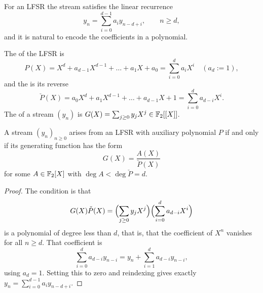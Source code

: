 \documentclass[a4paper]{scrartcl}
\begin{document}
\begin{center}
\end{center}

For an LFSR the stream satisfies the linear recurrence
$$y_n = \sum_{i=0}^{d-1}a_iy_{n-d+i}, \qquad n \ge d,$$
and it is natural to encode the coefficients in a polynomial.

\begin{definition}
	The  of the LFSR is
	$$P(X) = X^d + a_{d-1}X^{d-1}+\dots+a_1X+a_0 = \sum_{i=0}^d a_iX^i \quad (a_d := 1),$$
	and the  is its reverse
	$$\check P(X) = a_0X^d+a_1X^{d-1}+\dots+a_{d-1}X+1 = \sum_{i=0}^d a_{d-i}X^i.$$
	The  of a stream $(y_n)$ is $G(X) = \sum_{j\ge0}y_jX^j \in \mathbb{F}_2[[X]]$.
\end{definition}

\begin{theorem}\label{thm:lfsrgf}
	A stream $(y_n)_{n\ge0}$ arises from an LFSR with auxiliary polynomial $P$ if and only if its generating function has the form
	$$G(X) = \frac{A(X)}{\check P(X)}$$
	for some $A \in \mathbb{F}_2[X]$ with $\deg A < \deg\check P = d$.
\end{theorem}

\begin{proof}
	The condition is that
	$$G(X)\check P(X) = \Bigl(\sum_{j\ge0}y_jX^j\Bigr)\Bigl(\sum_{i=0}^d a_{d-i}X^i\Bigr)$$
	is a polynomial of degree less than $d$, that is, that the coefficient of $X^n$ vanishes for all $n \ge d$. That coefficient is
	$$\sum_{i=0}^d a_{d-i}y_{n-i} = y_n + \sum_{i=1}^{d}a_{d-i}y_{n-i},$$
	using $a_d = 1$. Setting this to zero and reindexing gives exactly $y_n = \sum_{i=0}^{d-1}a_iy_{n-d+i}$.
\end{proof}
\end{document}
